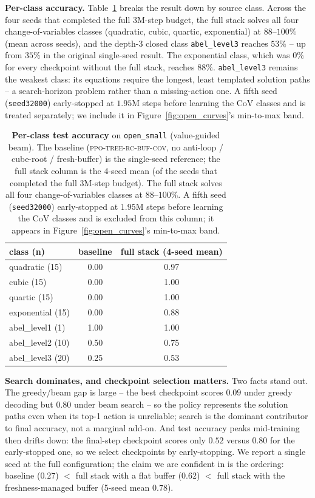 \documentclass{article}
\theoremstyle{plain}
\theoremstyle{definition}
\theoremstyle{remark}
\begin{document}
\textbf{Per-class accuracy.} Table~\ref{tab:per_class} breaks the result down by source class. Across the four seeds that completed the full $3\text{M}$-step budget, the full stack solves all four change-of-variables classes (quadratic, cubic, quartic, exponential) at $88$--$100\%$ (mean across seeds), and the depth-3 closed class \texttt{abel\_level3} reaches $53\%$ -- up from $35\%$ in the original single-seed result. The exponential class, which was $0\%$ for every checkpoint without the full stack, reaches $88\%$. \texttt{abel\_level3} remains the weakest class: its equations require the longest, least templated solution paths -- a search-horizon problem rather than a missing-action one. A fifth seed (\texttt{seed32000}) early-stopped at $1.95\text{M}$ steps before learning the CoV classes and is treated separately; we include it in Figure~\ref{fig:open_curves}'s min-to-max band.

\begin{table}[h]
\centering
\small
\begin{tabular}{lcc}
\toprule
class (n)            & baseline & full stack (4-seed mean) \\
\midrule
quadratic (15)       & 0.00 & 0.97 \\
cubic (15)           & 0.00 & 1.00 \\
quartic (15)         & 0.00 & 1.00 \\
exponential (15)     & 0.00 & 0.88 \\
abel\_level1 (1)     & 1.00 & 1.00 \\
abel\_level2 (10)    & 0.50 & 0.75 \\
abel\_level3 (20)    & 0.25 & 0.53 \\
\bottomrule
\end{tabular}
\caption{\textbf{Per-class test accuracy} on \texttt{open\_small} (value-guided beam). The baseline (\textsc{ppo-tree-rc-buf-cov}, no anti-loop / cube-root / fresh-buffer) is the single-seed reference; the full stack column is the 4-seed mean (of the seeds that completed the full $3\text{M}$-step budget). The full stack solves all four change-of-variables classes at $88$--$100\%$. A fifth seed (\texttt{seed32000}) early-stopped at $1.95\text{M}$ steps before learning the CoV classes and is excluded from this column; it appears in Figure~\ref{fig:open_curves}'s min-to-max band.}
\label{tab:per_class}
\end{table}

\textbf{Search dominates, and checkpoint selection matters.} Two facts stand out. The greedy/beam gap is large -- the best checkpoint scores $0.09$ under greedy decoding but $0.80$ under beam search -- so the policy represents the solution paths even when its top-1 action is unreliable; search is the dominant contributor to final accuracy, not a marginal add-on. And test accuracy peaks mid-training then drifts down: the final-step checkpoint scores only $0.52$ versus $0.80$ for the early-stopped one, so we select checkpoints by early-stopping. We report a single seed at the full configuration; the claim we are confident in is the ordering: baseline ($0.27$) $<$ full stack with a flat buffer ($0.62$) $<$ full stack with the freshness-managed buffer (5-seed mean $0.78$).
\end{document}

